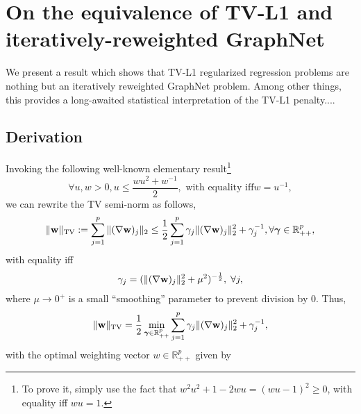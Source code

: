 
\section{On the equivalence of TV-L1 and iteratively-reweighted
  GraphNet}
We present a result which shows that TV-L1 regularized regression problems are nothing but an iteratively reweighted GraphNet problem. Among other things, this provides a long-awaited statistical interpretation of the TV-L1 penalty....

\subsection{Derivation}
Invoking the following
well-known elementary result\footnote{To prove it, simply use the fact
  that $w^2u^2 + 1 - 2wu = (wu - 1)^2 \ge 0$, with equality iff $wu =
  1$.}
\begin{equation}
\label{eq:rabbit}
\forall u,w > 0, u \le \frac{wu^2 + w^{-1}}{2},\text{ with equality iff
} w = u^{-1},
\end{equation}
we can rewrite the TV semi-norm as follows,
\begin{eqnarray}
\begin{split}
 \|\mathbf{w}\|_{\text{TV}} := \sum_{j=1}^p\|(\nabla
 \mathbf{w})_j\|_2  \le \frac{1}{2}
\sum_{j=1}^p \gamma_j\|(\nabla \mathbf{w})_j\|_2^2 + \gamma_j^{-1},
\forall \boldsymbol{\gamma} \in \mathbb R_{++}^p,
\end{split}
\end{eqnarray}
with equality  iff
\begin{eqnarray}
\gamma_j = (\|(\nabla \mathbf{w})_j\|_2^2 + \mu^2)^{-\frac{1}{2}},\;\forall j,
\label{eq:weights}
\end{eqnarray}
where $\mu \rightarrow 0^+$ is a small ``smoothing'' parameter to
prevent division by $0$. Thus,
\begin{eqnarray}
\|\mathbf{w}\|_{\text{TV}} = \frac{1}{2}\min_{\boldsymbol{\gamma} \in
  \mathbb R_{++}^p}
\sum_{j=1}^p \gamma_j\|(\nabla \mathbf{w})_j\|_2^2 + \gamma_j^{-1}
,
\end{eqnarray}
with the optimal weighting vector $w \in \mathbb R_{++}^p$ given by

